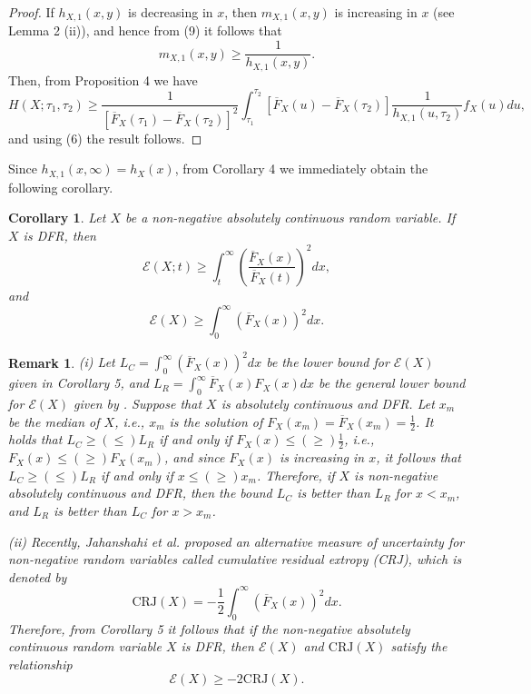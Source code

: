 \documentclass[11pt]{article}
\newtheorem{corollary}{Corollary}
\newtheorem{remark}{Remark}
\begin{document}
\begin{proof}
	If $h_{X,1}(x,y)$ is decreasing in $x$, then $m_{X,1}(x,y)$ is increasing in $x$ (see Lemma 2 (ii)), and hence from (9) it follows that
	$$ m_{X,1}(x,y) \geq \frac{1}{h_{X,1}(x,y)}. $$
	Then, from Proposition 4 we have
	$$ \textstyle H(X;\tau_1,\tau_2) \geq \frac{1}{[\overline{F}_X(\tau_1) - \overline{F}_X(\tau_2)]^2} \int_{\tau_1}^{\tau_2} [\overline{F}_X(u) - \overline{F}_X(\tau_2)] \frac{1}{h_{X,1}(u,\tau_2)} f_X(u) du, $$
	and using (6) the result follows.
\end{proof}

Since $h_{X,1}(x,\infty) = h_X(x)$, from Corollary 4 we immediately obtain the following corollary.

 
\begin{corollary}
	Let $X$ be a non-negative absolutely continuous random variable. If $X$ is DFR, then
	$$ \textstyle \mathcal{E}(X;t) \geq \int_t^\infty \left( \frac{\overline{F}_X(x)}{\overline{F}_X(t)} \right)^2 dx, $$
	and
	$$ \textstyle \mathcal{E}(X) \geq \int_0^\infty \left( \overline{F}_X(x) \right)^2 dx. $$
\end{corollary}

 
\begin{remark}  
	(i) Let $L_C = \int_0^\infty (\overline{F}_X(x))^2 dx$ be the lower bound for $\mathcal{E}(X)$ given in Corollary 5, and $L_R = \int_0^\infty \overline{F}_X(x) F_X(x) dx$ be the general lower bound for $\mathcal{E}(X)$ given by \cite{Rao2005}. Suppose that $X$ is absolutely continuous and DFR. Let $x_m$ be the median of $X$, i.e., $x_m$ is the solution of $F_X(x_m) = \overline{F}_X(x_m) = \frac{1}{2}$. It holds that $L_C \geq (\leq) L_R$ if and only if $F_X(x) \leq (\geq) \frac{1}{2}$, i.e., $F_X(x) \leq (\geq) F_X(x_m)$, and since $F_X(x)$ is increasing in $x$, it follows that $L_C \geq (\leq) L_R$ if and only if $x \leq (\geq) x_m$. Therefore, if $X$ is non-negative absolutely continuous and DFR, then the bound $L_C$ is better than $L_R$ for $x < x_m$, and $L_R$ is better than $L_C$ for $x > x_m$.
	
	\noindent (ii) Recently, Jahanshahi et al. \cite{Jahanshahi2020} proposed an alternative measure of uncertainty for non-negative random variables called cumulative residual extropy (CRJ), which is denoted by
	$$ \textstyle \text{CRJ}(X) = -\frac{1}{2} \int_0^\infty (\overline{F}_X(x))^2 dx. $$
	Therefore, from Corollary 5 it follows that if the non-negative absolutely continuous random variable $X$ is DFR, then $\mathcal{E}(X)$ and $\text{CRJ}(X)$ satisfy the relationship
	$$ \mathcal{E}(X) \geq -2 \text{CRJ}(X). $$
\end{remark}
\end{document}
